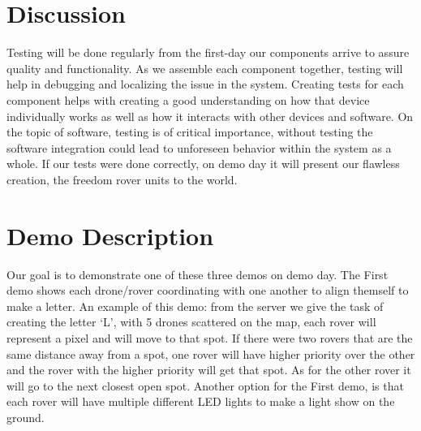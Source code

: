 
\section{Discussion}
Testing will be done regularly from the first-day our components arrive to assure quality and functionality. As we assemble each component together, testing will help in debugging and localizing the issue in the system. Creating tests for each component helps with creating a good understanding on how that device individually works as well as how it interacts with other devices and software. On the topic of software, testing is of critical importance, without testing the software integration could lead to unforeseen behavior within the system as a whole. If our tests were done correctly, on demo day it will present our flawless creation, the freedom rover units to the world.
\section{Demo Description}
Our goal is to demonstrate one of these three demos on demo day. The First demo shows each drone/rover coordinating with one another to align themself to make a letter. An example of this demo: from the server we give the task of creating the letter ‘L’, with 5 drones scattered on the map, each rover will represent a pixel and will move to that spot. If there were two rovers that are the same distance away from a spot, one rover will have higher priority over the other and the rover with the higher priority will get that spot. As for the other rover it will go to the next closest open spot. Another option for the First demo, is that each rover will have multiple different LED lights to make a light show on the ground.

